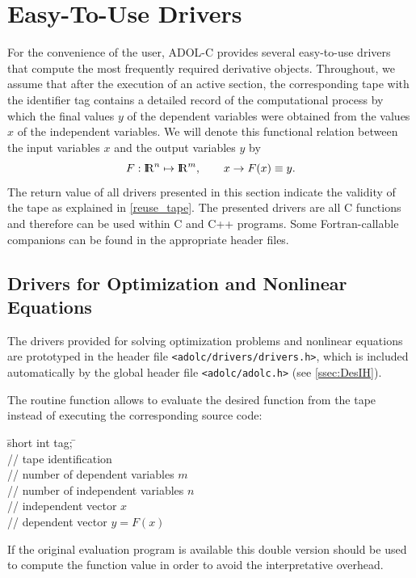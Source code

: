 \documentclass[11pt,twoside]{article}
\newcommand{\R}{{ {\rm I} \kern -.225em {\rm R} }}
\begin{document}
%
%
%
\section{Easy-To-Use Drivers}
\label{drivers}
%
For the convenience of the user, ADOL-C provides several
easy-to-use drivers that compute the most frequently required
derivative objects. Throughout, we assume that after the execution of an
active section, the corresponding tape with the identifier {\sf tag}
contains a detailed record of the computational process by which the
final values $y$ of the dependent variables were obtained from the
values $x$ of the independent variables. We will denote this functional
relation between the input variables $x$ and the output variables $y$ by
\[
F : \R^n \mapsto \R^m, \qquad x \rightarrow F(x) \equiv y.
\]
The return value of all drivers presented in this section
indicate the validity of the tape as explained in \autoref{reuse_tape}.
The presented drivers are all C functions and therefore can be used within
C and C++ programs. Some Fortran-callable companions can be found
in the appropriate header files. 
%
\subsection{Drivers for Optimization and Nonlinear Equations}
%
\label{optdrivers}
%
The drivers provided for solving optimization problems and nonlinear
equations are prototyped in the header file \verb=<adolc/drivers/drivers.h>=,
which is included automatically by the global header file \verb=<adolc/adolc.h>=
(see \autoref{ssec:DesIH}). 

The routine {\sf function} allows to evaluate the desired function from 
the tape instead of executing the corresponding source code:
%
\begin{tabbing}
\hspace{0.5in}\={\sf short int tag;} \hspace{1.1in}\= \kill    %
\\
         \> // tape identification \\
                 \> // number of dependent variables $m$\\
                 \> // number of independent variables $n$\\
           \> // independent vector $x$ \\
           \> // dependent vector $y=F(x)$ 
\end{tabbing}
%
If the original evaluation program is available this double version 
should be used to compute the function value in order to avoid the
interpretative overhead.  
\end{document}
